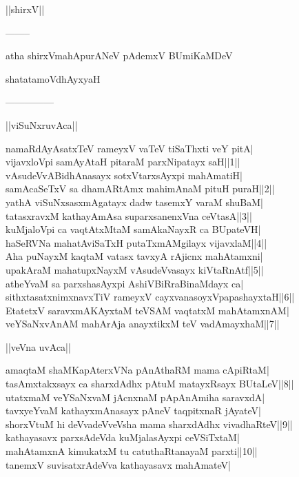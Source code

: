 \documentclass{article}
\begin{document}
\begin{center}
||shirxV||
\end{center}

\begin{center}
--------
\end{center}

\begin{center}
atha shirxVmahApurANeV pAdemxV BUmiKaMDeV
\end{center}

\begin{center}
shatatamoVdhAyxyaH
\end{center}

\begin{center}
---------------
\end{center}

\begin{center}
||viSuNxruvAca||
\end{center}

namaRdAyAsatxTeV rameyxV vaTeV tiSaThxti veY pitA|\\
vijavxloVpi samAyAtaH pitaraM parxNipatayx saH||1||\\
vAsudeVvABidhAnasayx sotxVtarxsAyxpi mahAmatiH|\\
samAcaSeTxV sa dhamARtAmx mahimAnaM pituH puraH||2||\\
yathA viSuNxsasxmAgatayx dadw tasemxY varaM shuBaM|\\
tatasxravxM kathayAmAsa suparxsanenxVna ceVtasA||3||\\
kuMjaloVpi ca vaqtAtxMtaM samAkaNayxR ca BUpateVH|\\
haSeRVNa mahatAviSaTxH putaTxmAMgilayx vijavxlaM||4||\\
Aha puNayxM kaqtaM vatasx tavxyA rAjicnx mahAtamxni|\\
upakAraM mahatupxNayxM vAsudeVvasayx kiVtaRnAtf||5||\\
atheYvaM sa parxshasAyxpi AshiVBiRraBinaMdayx ca|\\
sithxtasatxnimxnavxTiV rameyxV cayxvanasoyxVpapashayxtaH||6||\\
EtatetxV saravxmAKAyxtaM teVSAM  vaqtatxM mahAtamxnAM|\\
veYSaNxvAnAM mahArAja anayxtikxM teV vadAmayxhaM||7||\\

\begin{center}
||veVna uvAca||
\end{center}

amaqtaM shaMKapAterxVNa pAnAthaRM mama cApiRtaM|\\
tasAmxtakxsayx ca sharxdAdhx pAtuM matayxRsayx BUtaLeV||8||\\
utatxmaM veYSaNxvaM jAcnxnaM pApAnAmiha saravxdA|\\
tavxyeYvaM kathayxmAnasayx pAneV taqpitxnaR jAyateV|\\
shorxVtuM hi deVvadeVveVsha mama sharxdAdhx vivadhaRteV||9||\\
kathayasavx parxsAdeVda kuMjalasAyxpi ceVSiTxtaM|\\
mahAtamxnA kimukatxM tu catuthaRtanayaM parxti||10||\\
tanemxV suvisatxrAdeVva kathayasavx mahAmateV|\\
\end{document}
